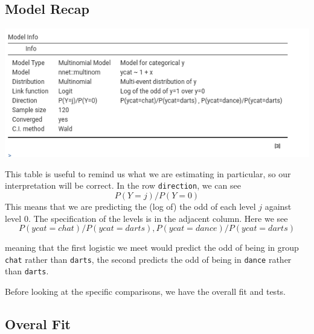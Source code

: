 \documentclass[
]{book}
\begin{document}
\hypertarget{model-recap-1}{%
\subsection{Model Recap}\label{model-recap-1}}

\includegraphics[width=8.06in]{bookletpics/3_multi_output2}

This table is useful to remind us what we are estimating in particular, so our interpretation will be correct. In the row \texttt{direction}, we can see
\[
P(Y=j)/P(Y=0)
\]
This means that we are predicting the (log of) the odd of each level \(j\) against level 0. The specification of the levels is in the adjacent column. Here we see
\[
P(ycat=chat)/P(ycat=darts), P(ycat=dance)/P(ycat=darts) 
\]

meaning that the first logistic we meet would predict the odd of being in group \texttt{chat} rather than \texttt{darts}, the second predicts the odd of being in \texttt{dance} rather than \texttt{darts}.

Before looking at the specific comparisons, we have the overall fit and tests.

\hypertarget{overal-fit}{%
\subsection{Overal Fit}\label{overal-fit}}
\end{document}
